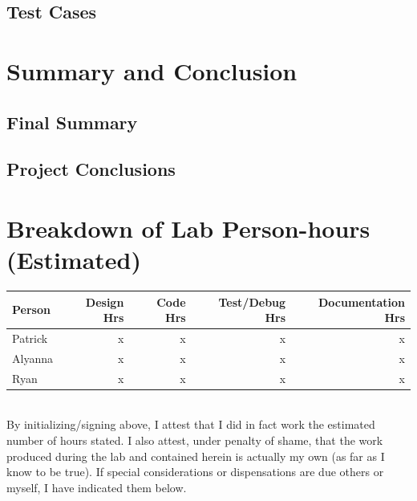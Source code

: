 \documentclass[12pt]{article} %
\begin{document}
\subsection{Test Cases  }
%

\section{Summary and Conclusion}
%

\subsection{Final Summary}


\subsection{Project Conclusions}


\pagebreak
\appendix


\section{Breakdown of Lab Person-hours (Estimated)}
\begin{tabular}{|l|*{4}{r|}}
	\hline
	Person & Design Hrs & Code Hrs & Test/Debug Hrs & Documentation Hrs \\ \hline
	Patrick & x & x & x & x  \\ \hline
	Alyanna & x & x & x & x \\ \hline
	Ryan & x & x & x & x  \\ \hline
\end{tabular}

~\\

By initializing/signing above, I attest that I did in fact work the
estimated number of hours stated. I also attest, under penalty of shame,
that the work produced during the lab and contained herein is actually my
own (as far as I know to be true). If special considerations or
dispensations are due others or myself, I have indicated them below.
\end{document}
